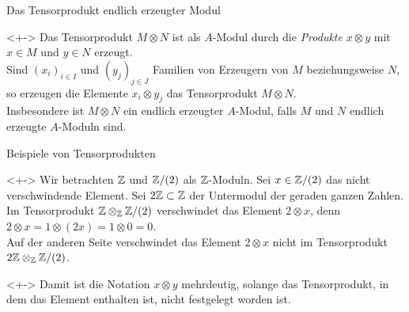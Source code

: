 \begin{frame}{Das Tensorprodukt endlich erzeugter Modul}
	\begin{remark}<+->
		Das Tensorprodukt \(M \otimes N\) ist als \(A\)-Modul durch die \emph{Produkte} \(x \otimes y\) mit
		\(x \in M\) und  \(y \in N\) erzeugt.
		\\
		Sind \((x_i)_{i \in I}\) und \((y_j)_{j \in J}\) Familien von Erzeugern von \(M\) beziehungsweise
		\(N\), so erzeugen die Elemente \(x_i \otimes y_j\) das Tensorprodukt \(M \otimes N\).
		\\
		Insbesondere ist \(M \otimes N\) ein endlich erzeugter \(A\)-Modul, falls \(M\) und \(N\) endlich
		erzeugte \(A\)-Moduln sind.
	\end{remark}
\end{frame}

\begin{frame}{Beispiele von Tensorprodukten}
	\begin{example}<+->
		Wir betrachten \(\mathbb Z\) und \(\mathbb Z/(2)\) als \(\mathbb Z\)-Moduln. Sei \(x \in \mathbb Z/(2)\) das
		nicht verschwindende Element. Sei \(2 \mathbb Z \subset \mathbb Z\) der Untermodul der geraden ganzen
		Zahlen.
		\\
		Im Tensorprodukt \(\mathbb Z \otimes_{\mathbb Z} \mathbb Z/(2)\) verschwindet das Element \(2 \otimes x\), denn
		\(2 \otimes x = 1 \otimes (2x) = 1 \otimes 0 = 0\).
		\\
		Auf der anderen Seite verschwindet das Element \(2 \otimes x\) nicht im Tensorprodukt
		\(2 \mathbb Z \otimes_{\mathbb Z} \mathbb Z/(2)\).
	\end{example}
	\begin{visibleenv}<+->
		Damit ist die Notation \(x \otimes y\) mehrdeutig, solange das Tensorprodukt, in dem das Element enthalten
		ist, nicht festgelegt worden ist.
	\end{visibleenv}
\end{frame}


